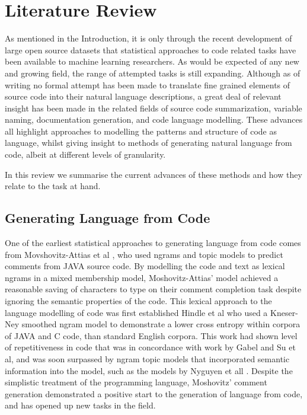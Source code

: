 \chapter{Literature Review}
\label{literature_review}


As mentioned in the Introduction, it is only through the recent development of large open source datasets that statistical approaches to code related tasks have been available to machine learning researchers. 
As would be expected of any new and growing field, the range of attempted tasks is still expanding. 
Although as of writing no formal attempt has been made to translate fine grained elements of source code into their natural language descriptions, a great deal of relevant insight has been made in the related fields of source code summarization, variable naming, documentation generation, and code language modelling. 
These advances all highlight approaches to modelling the patterns and structure of code as language, whilst giving insight to methods of generating natural language from code, albeit at different levels of granularity.

In this review we summarise the current advances of these methods and how they relate to the task at hand.  

\section{Generating Language from Code}

One of the earliest statistical approaches to generating language from code comes from Movshovitz-Attias et al \cite{movshovitz-attias_natural_nodate}, who used ngrams and topic models to predict comments from JAVA source code.
By modelling the code and text as lexical ngrams in a mixed membership model, Moshovitz-Attias' model achieved a reasonable saving of characters to type on their comment completion task despite ignoring the semantic properties of the code.
This lexical approach to the language modelling of code was first established Hindle et al \cite{hindle_naturalness_nodate} who used a Kneser-Ney smoothed ngram model to demonstrate a lower cross entropy within corpora of JAVA and C code, than standard English corpora. This work had shown level of repetitiveness in code that was in concordance with work by Gabel and Su et al\cite{gabel_study_2010}, and was soon surpassed by ngram topic models that incorporated semantic information into the model, such as the models by Nyguyen et all \cite{nguyen_statistical_2013}.
Despite the simplistic treatment of the programming language, Moshovitz' comment generation demonstrated a positive start to the generation of language from code, and has opened up new tasks in the field.


